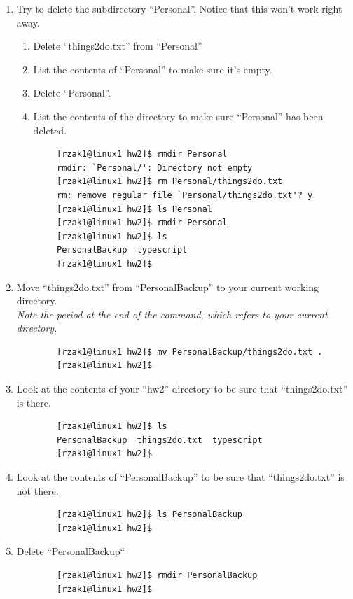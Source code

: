\documentclass[letter,11pt]{article}
\begin{document}
\begin{enumerate}
    \item Try to delete the subdirectory ``Personal''. Notice that this won't work right away.
    \begin{enumerate}
        \item Delete ``things2do.txt'' from ``Personal''
        \item List the contents of ``Personal'' to make sure it's empty.
        \item Delete ``Personal''.
        \item List the contents of the directory to make sure ``Personal'' has been deleted.
    \end{enumerate}
    \begin{verbatim}
        [rzak1@linux1 hw2]$ rmdir Personal
        rmdir: `Personal/': Directory not empty
        [rzak1@linux1 hw2]$ rm Personal/things2do.txt
        rm: remove regular file `Personal/things2do.txt'? y
        [rzak1@linux1 hw2]$ ls Personal
        [rzak1@linux1 hw2]$ rmdir Personal
        [rzak1@linux1 hw2]$ ls
        PersonalBackup  typescript
        [rzak1@linux1 hw2]$\end{verbatim}
    \item Move ``things2do.txt'' from ``PersonalBackup'' to your current working directory. \\
    \textit{Note the period at the end of the command, which refers to your current directory.}
    \begin{verbatim}
        [rzak1@linux1 hw2]$ mv PersonalBackup/things2do.txt .
        [rzak1@linux1 hw2]$\end{verbatim}
    \item Look at the contents of your ``hw2'' directory to be sure that ``things2do.txt'' is there.
    \begin{verbatim}
        [rzak1@linux1 hw2]$ ls
        PersonalBackup  things2do.txt  typescript
        [rzak1@linux1 hw2]$\end{verbatim}
    \item Look at the contents of ``PersonalBackup'' to be sure that ``things2do.txt'' is not there.
    \begin{verbatim}
        [rzak1@linux1 hw2]$ ls PersonalBackup
        [rzak1@linux1 hw2]$\end{verbatim}
    \item Delete ``PersonalBackup``
    \begin{verbatim}
        [rzak1@linux1 hw2]$ rmdir PersonalBackup
        [rzak1@linux1 hw2]$\end{verbatim}

\end{enumerate}
\end{document}
